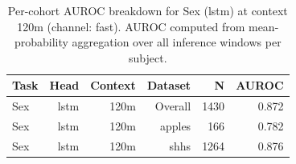\begin{table}[ht]
\centering
\caption{Per-cohort AUROC breakdown for Sex (lstm) at context 120m (channel: fast). AUROC computed from mean-probability aggregation over all inference windows per subject.}
\label{tab:cohort_sex_binary_lstm_fast}
\begin{tabular}{lrrrrr}
\toprule
Task & Head & Context & Dataset & N & AUROC \\
\midrule
Sex & lstm & 120m & Overall & 1430 & 0.872 \\
Sex & lstm & 120m & apples & 166 & 0.782 \\
Sex & lstm & 120m & shhs & 1264 & 0.876 \\
\bottomrule
\end{tabular}
\end{table}